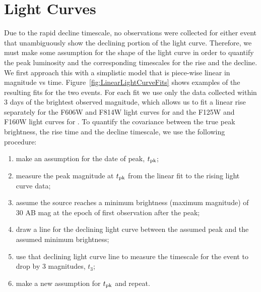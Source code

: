 \section{Light Curves}\label{sec:LightCurves}
  
  
Due to the rapid decline timescale, no observations were collected for
either event that unambiguously show the declining portion of the
light curve. Therefore, we must make some assumption for the shape of
the light curve in order to quantify the peak luminosity and the
corresponding timescales for the rise and the decline.  We first
approach this with a simplistic model that is piece-wise linear in
magnitude vs time.  Figure~\ref{fig:LinearLightCurveFits} shows
examples of the resulting fits for the two events.  For each fit we
use only the data collected within 3 days of the brightest observed
magnitude, which allows us to fit a linear rise separately for the
F606W and F814W light curves for \spockone and the F125W and F160W
light curves for \spocktwo. To quantify the covariance between the
true peak brightness, the rise time and the decline timescale, we use
the following procedure:

\begin{enumerate}
\item make an assumption for the date of peak, $t_{\rm pk}$;
\item measure the peak magnitude at $t_{\rm pk}$ from the linear fit
  to the rising light curve data;
\item assume the source reaches a minimum brightness (maximum
  magnitude) of 30 AB mag at the epoch of first observation after the
  peak;
\item draw a line for the declining light curve between the assumed
  peak and the assumed minimum brightness;
\item use that declining light curve line to measure the timescale for
  the event to drop by 3 magnitudes, $t_3$;
\item make a new assumption for $t_{\rm pk}$ and repeat.
\end{enumerate}

